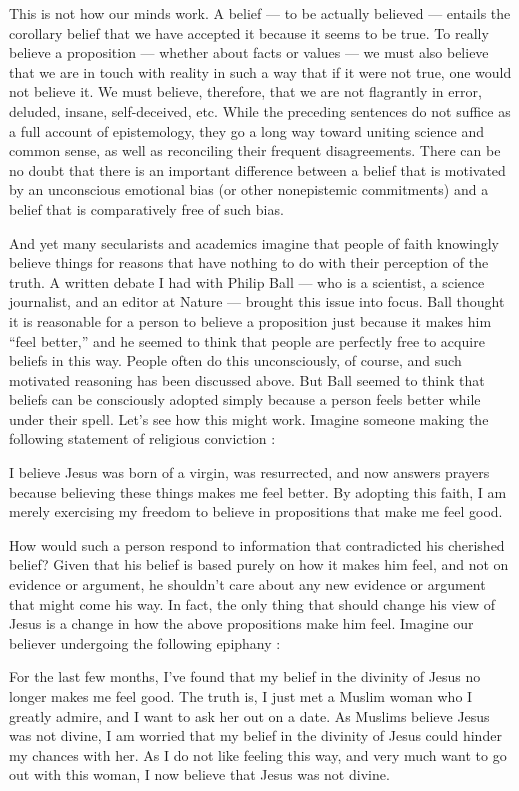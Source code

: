 \documentclass[a4paper,14pt]{extbook}
\begin{document}
This is not how our minds work.
A belief --- to be actually believed --- entails the corollary belief that we have accepted it because it seems to be true.
To really believe a proposition --- whether about facts or values --- we must also believe that we are in touch with reality in such a way that if it were not true, one would not believe it.
We must believe, therefore, that we are not flagrantly in error, deluded, insane, self-deceived, etc.
While the preceding sentences do not suffice as a full account of epistemology, they go a long way toward uniting science and common sense, as well as reconciling their frequent disagreements.
There can be no doubt that there is an important difference between a belief that is motivated by an unconscious emotional bias (or other nonepistemic commitments) and a belief that is comparatively free of such bias.

And yet many secularists and academics imagine that people of faith knowingly believe things for reasons that have nothing to do with their perception of the truth.
A written debate I had with Philip Ball --- who is a scientist, a science journalist, and an editor at Nature --- brought this issue into focus.
Ball thought it is reasonable for a person to believe a proposition just because it makes him ``feel better,'' and he seemed to think that people are perfectly free to acquire beliefs in this way.
People often do this unconsciously, of course, and such motivated reasoning has been discussed above.
But Ball seemed to think that beliefs can be consciously adopted simply because a person feels better while under their spell.
Let’s see how this might work.
Imagine someone making the following statement of religious conviction :

I believe Jesus was born of a virgin, was resurrected, and now answers prayers because believing these things makes me feel better.
By adopting this faith, I am merely exercising my freedom to believe in propositions that make me feel good.

How would such a person respond to information that contradicted his cherished belief?
Given that his belief is based purely on how it makes him feel, and not on evidence or argument, he shouldn’t care about any new evidence or argument that might come his way.
In fact, the only thing that should change his view of Jesus is a change in how the above propositions make him feel.
Imagine our believer undergoing the following epiphany :

For the last few months, I’ve found that my belief in the divinity of Jesus no longer makes me feel good.
The truth is, I just met a Muslim woman who I greatly admire, and I want to ask her out on a date.
As Muslims believe Jesus was not divine, I am worried that my belief in the divinity of Jesus could hinder my chances with her.
As I do not like feeling this way, and very much want to go out with this woman, I now believe that Jesus was not divine.
\end{document}
